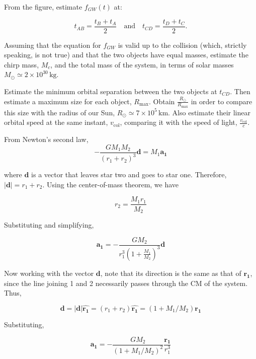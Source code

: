 \documentclass[11pt]{article}
\begin{document}
\begin{pproblem}
\begin{alternativas}
    \item From the figure, estimate \( f_{GW}(t) \) at:

    \[
    t_{AB} = \frac{t_B + t_A}{2} \quad \text{and} \quad t_{CD} = \frac{t_D + t_C}{2}.
    \]
    
    Assuming that the equation for \(f_{GW}\) is valid up to the collision (which, strictly speaking, is not true) and that the two objects have equal masses, estimate the chirp mass, \( M_c \), and the total mass of the system, in terms of solar masses \( M_\odot \simeq 2 \times 10^{30} \, \text{kg}\).

    \item Estimate the minimum orbital separation between the two objects at \( t_{CD} \). 
    Then estimate a maximum size for each object, \( R_{\text{max}} \). 
    Obtain \( \frac{R_\odot}{R_{\text{max}}} \) in order to compare this size with the radius of our Sun, \( R_\odot \simeq 7 \times 10^5 \, \text{km} \). 
    Also estimate their linear orbital speed at the same instant, \( v_{\text{col}} \), comparing it with the speed of light, \( \frac{v_{\text{col}}}{c} \).
\end{alternativas}

\begin{pssolution*}{}{}
    \begin{alternativas}
        \item From Newton's second law,
        \[-\frac{GM_1M_2}{(r_1+r_2)^3}\mathbf{d} = M_1\mathbf{a_1}\]

        where \(\mathbf{d}\) is a vector that leaves star two and goes to star one. Therefore, \(|\mathbf{d}| = r_1+r_2\). Using the center-of-mass theorem, we have

        \[r_2 = \frac{M_1r_1}{M_2}\]

        Substituting and simplifying,

        \[\mathbf{a_1} = -\frac{GM_2}{r_1^3(1+\frac{M_1}{M_2})^3}\mathbf{d}\]

        Now working with the vector \(\mathbf{d}\), note that its direction is the same as that of \(\mathbf{r_1}\), since the line joining 1 and 2 necessarily passes through the CM of the system. Thus,

        \[\mathbf{d} = |\mathbf{d}|\hat{\mathbf{r_1}} = (r_1+r_2)\hat{\mathbf{r_1}} = (1+M_1/M_2)\mathbf{r_1}\]

        Substituting,

        \[\mathbf{a_1} = -\frac{GM_2}{(1+M_1/M_2)^2}\frac{\mathbf{r_1}}{r_1^3}\]


\end{alternativas}
\end{pssolution*}
\end{pproblem}
\end{document}
